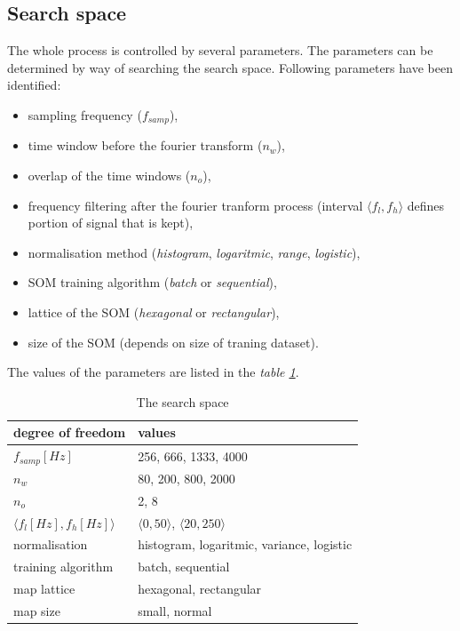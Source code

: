 \documentclass[a4paper]{IEEEtran}
\begin{document}
\subsection{Search space}
\label{sec:ex_search}
The whole process is controlled by several parameters.
The parameters can be determined by way of searching the search space.
Following parameters have been identified:
\begin{itemize}
	\item sampling frequency ($ f_{samp} $),
	\item time window before the fourier transform ($ n_w $),
	\item overlap of the time windows ($ n_o $),
	\item frequency filtering after the fourier tranform process (interval $ \langle f_l, f_h
	\rangle $ defines portion of signal that is kept),
	\item normalisation method (\textit{histogram}, \textit{logaritmic}, 
	\textit{range}, \textit{logistic}),
	\item SOM training algorithm (\textit{batch} or \textit{sequential}),
	\item lattice of the SOM (\textit{hexagonal} or \textit{rectangular}),
	\item size of the SOM (depends on size of traning dataset).
\end{itemize} %
The values of the parameters are listed  in the \textit{table \ref{tbl:searchspace}}.
\begin{table}[!h]
\caption{The search space}
	\begin{center}
		\begin{tabular}{|l|| l |}
			\hline
			degree of freedom & values \\
			\hline
			\hline
			$ f_{samp} [Hz] $ & 256, 666, 1333, 4000\\
			\hline
			$ n_w $ & 80, 200, 800, 2000 \\
			\hline
			$ n_o $ & 2, 8 \\
			\hline
			$ \langle f_l[Hz], f_h[Hz] \rangle $ & $ \langle 0, 50\rangle $,  
			$ \langle 20, 250\rangle $  \\
			\hline
			normalisation & histogram, logaritmic, variance, logistic \\
			\hline
			training algorithm & batch, sequential  \\
			\hline
			map lattice & hexagonal, rectangular \\
			\hline
			map size  & small, normal \\
			\hline
		\end{tabular}
	\end{center}
\label{tbl:searchspace}
\end{table}
\end{document}
